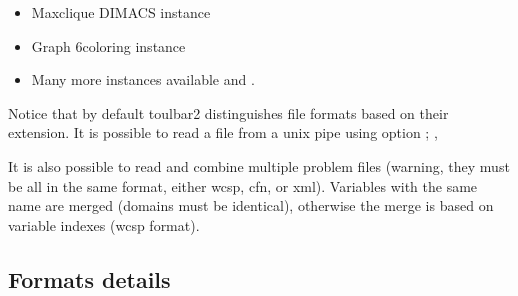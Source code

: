 \documentclass[letterpaper,10pt,openany,oneside,english]{sphinxmanual}
\begin{document}
\begin{itemize}
\item {} 
\sphinxAtStartPar
Max\sphinxhyphen{}clique DIMACS instance 

\item {} 
\sphinxAtStartPar
Graph 6\sphinxhyphen{}coloring instance 

\item {} 
\sphinxAtStartPar
Many more instances available  and  .

\end{itemize}

\sphinxAtStartPar
Notice that by default toulbar2 distinguishes file formats based on their extension.
It is possible to read a file from a unix pipe using option ; , 

\sphinxAtStartPar
It is also possible to read and combine multiple problem files (warning, they must be all in the same format, either wcsp, cfn, or xml).
Variables with the same name are merged (domains must be identical), otherwise the merge is based on variable indexes (wcsp format).


\subsection{Formats details}
\label{\detokenize{userdoc:formats-details}}
\sphinxstepscope
\end{document}
